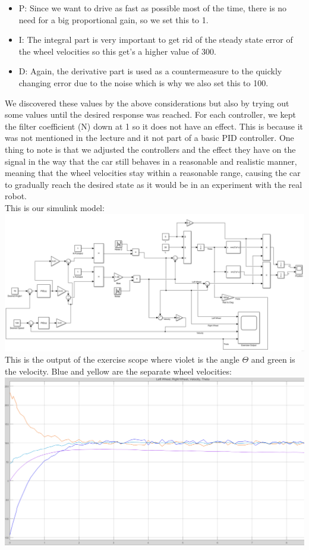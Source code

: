 \documentclass[12pt]{article}
\begin{document}
\begin{enumerate}[a)]
\begin{itemize}
\item P: Since we want to drive as fast as possible most of the time, there is no need for a big proportional gain, so we set this to 1.
\item I: The integral part is very important to get rid of the steady state error of the wheel velocities so this get's a higher value of 300.
\item D: Again, the derivative part is used as a countermeasure to the quickly changing error due to the noise which is why we also set this to 100.
\end{itemize}
We discovered these values by the above considerations but also by trying out some values until the desired response was reached. For each controller, we kept the filter coefficient (N) down at 1 so it does not have an effect. This is because it was not mentioned in the lecture and it not part of a basic PID controller. One thing to note is that we adjusted the controllers and the effect they have on the signal in the way that the car still behaves in a reasonable and realistic manner, meaning that the wheel velocities stay within a reasonable range, causing the car to gradually reach the desired state as it would be in an experiment with the real robot.\\
This is our simulink model:\\
\includegraphics[scale = 0.5]{figures/diff_drive}\\
This is the output of the exercise scope where violet is the angle $\Theta$ and green is the velocity. Blue and yellow are the separate wheel velocities:\\
\includegraphics[scale = 0.5]{figures/pid_graph}\\
\end{enumerate}
\end{document}
